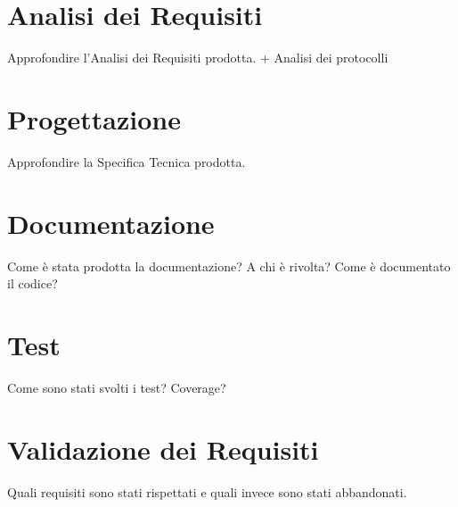 \section{Analisi dei Requisiti}

Approfondire l'Analisi dei Requisiti prodotta. + Analisi dei protocolli

\section{Progettazione}

Approfondire la Specifica Tecnica prodotta.


\section{Documentazione}

Come è stata prodotta la documentazione? A chi è rivolta? Come è documentato il codice?

\section{Test}

Come sono stati svolti i test? Coverage?


\section{Validazione dei Requisiti}

Quali requisiti sono stati rispettati e quali invece sono stati abbandonati.
